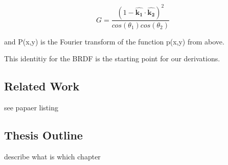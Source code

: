 \begin{equation}
    G = \frac{(1-\hat{\mathbf{k_1}}\cdot\hat{\mathbf{k_2}})^2}{cos(\theta_1)cos(\theta_2)}
\end{equation}

and P(x,y) is the Fourier transform of the function p(x,y) from above.

This identitiy for the BRDF is the starting point for our derivations.



\subsection{Related Work}
see papaer listing
\subsection{Thesis Outline}
describe what is which chapter

